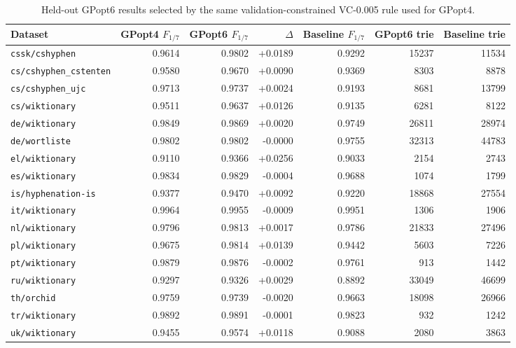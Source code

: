 \begin{table}[t]
\centering\small
\caption{Held-out GPopt6 results selected by the same validation-constrained VC-0.005 rule used for GPopt4.}
\label{tab:gpopt6-comparison}
\begin{tabular}{lrrrrrr}
\toprule
Dataset & GPopt4 $F_{1/7}$ & GPopt6 $F_{1/7}$ & $\Delta$ & Baseline $F_{1/7}$ & GPopt6 trie & Baseline trie \\
\midrule
\texttt{cssk/cshyphen} & 0.9614 & 0.9802 & +0.0189 & 0.9292 & 15237 & 11534 \\
\texttt{cs/cshyphen\_cstenten} & 0.9580 & 0.9670 & +0.0090 & 0.9369 & 8303 & 8878 \\
\texttt{cs/cshyphen\_ujc} & 0.9713 & 0.9737 & +0.0024 & 0.9193 & 8681 & 13799 \\
\texttt{cs/wiktionary} & 0.9511 & 0.9637 & +0.0126 & 0.9135 & 6281 & 8122 \\
\texttt{de/wiktionary} & 0.9849 & 0.9869 & +0.0020 & 0.9749 & 26811 & 28974 \\
\texttt{de/wortliste} & 0.9802 & 0.9802 & -0.0000 & 0.9755 & 32313 & 44783 \\
\texttt{el/wiktionary} & 0.9110 & 0.9366 & +0.0256 & 0.9033 & 2154 & 2743 \\
\texttt{es/wiktionary} & 0.9834 & 0.9829 & -0.0004 & 0.9688 & 1074 & 1799 \\
\texttt{is/hyphenation-is} & 0.9377 & 0.9470 & +0.0092 & 0.9220 & 18868 & 27554 \\
\texttt{it/wiktionary} & 0.9964 & 0.9955 & -0.0009 & 0.9951 & 1306 & 1906 \\
\texttt{nl/wiktionary} & 0.9796 & 0.9813 & +0.0017 & 0.9786 & 21833 & 27496 \\
\texttt{pl/wiktionary} & 0.9675 & 0.9814 & +0.0139 & 0.9442 & 5603 & 7226 \\
\texttt{pt/wiktionary} & 0.9879 & 0.9876 & -0.0002 & 0.9761 & 913 & 1442 \\
\texttt{ru/wiktionary} & 0.9297 & 0.9326 & +0.0029 & 0.8892 & 33049 & 46699 \\
\texttt{th/orchid} & 0.9759 & 0.9739 & -0.0020 & 0.9663 & 18098 & 26966 \\
\texttt{tr/wiktionary} & 0.9892 & 0.9891 & -0.0001 & 0.9823 & 932 & 1242 \\
\texttt{uk/wiktionary} & 0.9455 & 0.9574 & +0.0118 & 0.9088 & 2080 & 3863 \\
\bottomrule
\end{tabular}
\end{table}
